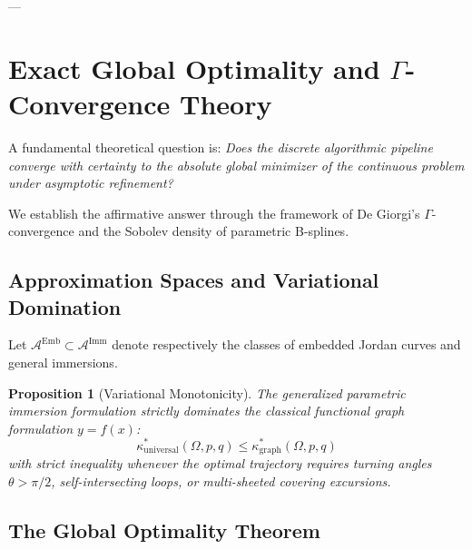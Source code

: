 \documentclass[11pt,reqno]{amsart}
\newtheorem{proposition}[theorem]{Proposition}
\theoremstyle{definition}
\numberwithin{equation}{section}
\begin{document}
---

\section{Exact Global Optimality and \texorpdfstring{$\Gamma$}{Gamma}-Convergence Theory}
\label{sec:gamma_convergence}

A fundamental theoretical question is: \emph{Does the discrete algorithmic pipeline converge with certainty to the absolute global minimizer of the continuous problem under asymptotic refinement?}

We establish the affirmative answer through the framework of De Giorgi's $\Gamma$-convergence and the Sobolev density of parametric B-splines.

\subsection{Approximation Spaces and Variational Domination}
Let $\mathcal{A}^{\mathrm{Emb}} \subset \mathcal{A}^{\mathrm{Imm}}$ denote respectively the classes of embedded Jordan curves and general immersions. 

\begin{proposition}[Variational Monotonicity]
The generalized parametric immersion formulation strictly dominates the classical functional graph formulation $y = f(x)$:
\begin{equation}
\kappa^*_{\mathrm{universal}}(\Omega, p, q) \le \kappa^*_{\mathrm{graph}}(\Omega, p, q)
\end{equation}
with strict inequality whenever the optimal trajectory requires turning angles $\theta > \pi/2$, self-intersecting loops, or multi-sheeted covering excursions.
\end{proposition}

\subsection{The Global Optimality Theorem}
\end{document}
